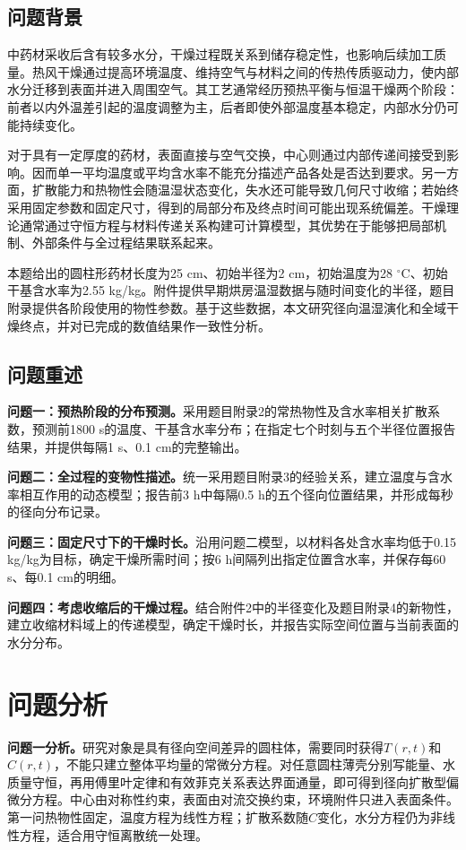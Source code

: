 \subsection{问题背景}
中药材采收后含有较多水分，干燥过程既关系到储存稳定性，也影响后续加工质量。热风干燥通过提高环境温度、维持空气与材料之间的传热传质驱动力，使内部水分迁移到表面并进入周围空气。其工艺通常经历预热平衡与恒温干燥两个阶段：前者以内外温差引起的温度调整为主，后者即使外部温度基本稳定，内部水分仍可能持续变化。

对于具有一定厚度的药材，表面直接与空气交换，中心则通过内部传递间接受到影响。因而单一平均温度或平均含水率不能充分描述产品各处是否达到要求。另一方面，扩散能力和热物性会随温湿状态变化，失水还可能导致几何尺寸收缩；若始终采用固定参数和固定尺寸，得到的局部分布及终点时间可能出现系统偏差。干燥理论通常通过守恒方程与材料传递关系构建可计算模型\cite{mujumdar,whitaker,defraeye}，其优势在于能够把局部机制、外部条件与全过程结果联系起来。

本题给出的圆柱形药材长度为25 cm、初始半径为2 cm，初始温度为28 $^\circ$C、初始干基含水率为2.55 kg/kg。附件提供早期烘房温湿数据与随时间变化的半径，题目附录提供各阶段使用的物性参数。基于这些数据，本文研究径向温湿演化和全域干燥终点，并对已完成的数值结果作一致性分析。

\subsection{问题重述}
\textbf{问题一：预热阶段的分布预测。}采用题目附录2的常热物性及含水率相关扩散系数，预测前1800 s的温度、干基含水率分布；在指定七个时刻与五个半径位置报告结果，并提供每隔1 s、0.1 cm的完整输出。

\textbf{问题二：全过程的变物性描述。}统一采用题目附录3的经验关系，建立温度与含水率相互作用的动态模型；报告前3 h中每隔0.5 h的五个径向位置结果，并形成每秒的径向分布记录。

\textbf{问题三：固定尺寸下的干燥时长。}沿用问题二模型，以材料各处含水率均低于0.15 kg/kg为目标，确定干燥所需时间；按6 h间隔列出指定位置含水率，并保存每60 s、每0.1 cm的明细。

\textbf{问题四：考虑收缩后的干燥过程。}结合附件2中的半径变化及题目附录4的新物性，建立收缩材料域上的传递模型，确定干燥时长，并报告实际空间位置与当前表面的水分分布。


\nextpage
\section{问题分析}
\textbf{问题一分析。}研究对象是具有径向空间差异的圆柱体，需要同时获得$T(r,t)$和$C(r,t)$，不能只建立整体平均量的常微分方程。对任意圆柱薄壳分别写能量、水质量守恒，再用傅里叶定律和有效菲克关系表达界面通量，即可得到径向扩散型偏微分方程。中心由对称性约束，表面由对流交换约束，环境附件只进入表面条件。第一问热物性固定，温度方程为线性方程；扩散系数随$C$变化，水分方程仍为非线性方程，适合用守恒离散统一处理。


